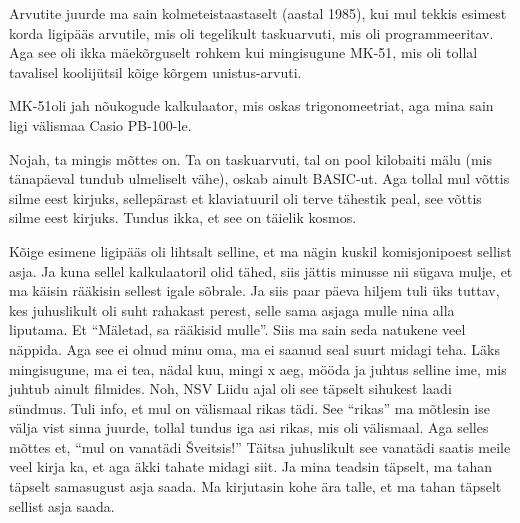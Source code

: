 

Arvutite juurde ma sain kolmeteistaastaselt (aastal 1985), kui mul tekkis esimest korda ligipääs arvutile, mis oli tegelikult taskuarvuti, mis oli programmeeritav. Aga see oli ikka mäekõrguselt rohkem kui mingisugune MK-51, mis oli tollal tavalisel koolijütsil kõige kõrgem unistus-arvuti. 


MK-51oli jah nõukogude kalkulaator, mis oskas trigonomeetriat, aga mina sain ligi välismaa Casio PB-100-le. 


Nojah, ta mingis mõttes on. Ta on taskuarvuti, tal on pool kilobaiti mälu (mis tänapäeval tundub ulmeliselt vähe), oskab ainult BASIC-ut. Aga tollal mul võttis silme eest kirjuks, sellepärast et klaviatuuril oli terve tähestik peal, see võttis silme eest kirjuks. Tundus ikka, et see on täielik kosmos. 


Kõige esimene ligipääs oli lihtsalt selline, et ma nägin kuskil komisjonipoest sellist asja. Ja kuna sellel kalkulaatoril olid tähed, siis jättis minusse nii sügava mulje, et ma käisin rääkisin sellest igale sõbrale. Ja siis paar päeva hiljem tuli üks tuttav, kes juhuslikult oli suht rahakast perest, selle sama asjaga mulle nina alla liputama. Et \enquote{Mäletad, sa rääkisid mulle}. Siis ma sain seda natukene veel näppida. Aga see ei olnud minu oma, ma ei saanud seal suurt midagi teha. Läks mingisugune, ma ei tea, nädal kuu, mingi x aeg, mööda ja juhtus selline ime, mis juhtub ainult filmides. Noh, NSV Liidu ajal oli see täpselt sihukest laadi sündmus. Tuli info, et mul on välismaal rikas tädi. See \enquote{rikas} ma mõtlesin ise välja vist sinna juurde, tollal tundus iga asi rikas, mis oli välismaal. Aga selles mõttes et, \enquote{mul on vanatädi Šveitsis!} Täitsa juhuslikult see vanatädi saatis meile veel kirja ka, et aga äkki tahate midagi siit. Ja mina teadsin täpselt, ma tahan täpselt samasugust asja saada. Ma kirjutasin kohe ära talle, et ma tahan täpselt sellist asja saada.

